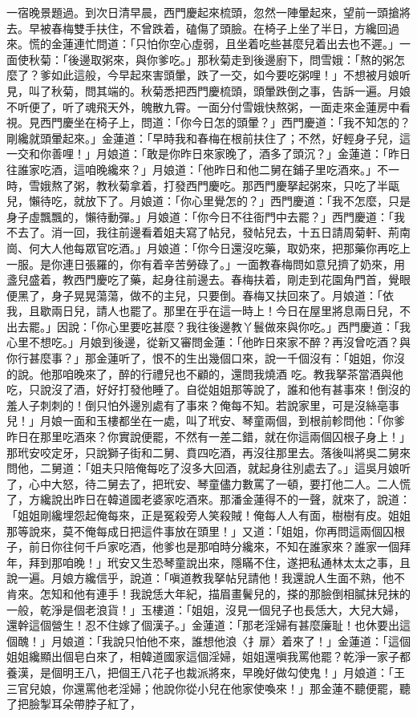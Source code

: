 一宿晚景題過。到次日清早晨，西門慶起來梳頭，忽然一陣暈起來，望前一頭搶將去。早被春梅雙手扶住，不曾跌着，磕傷了頭臉。在椅子上坐了半日，方纔回過來。慌的金蓮連忙問道：「只怕你空心虛弱，且坐着吃些甚麼兒着出去也不遲。」一面使秋菊：「後邊取粥來，與你爹吃。」那秋菊走到後邊廚下，問雪娥：「熬的粥怎麼了？爹如此這般，今早起來害頭暈，跌了一交，如今要吃粥哩！」不想被月娘听見，叫了秋菊，問其端的。秋菊悉把西門慶梳頭，頭暈跌倒之事，告訴一遍。月娘不听便了，听了魂飛天外，魄散九霄。一面分付雪娥快熬粥，一面走來金蓮房中看視。見西門慶坐在椅子上，問道：「你今日怎的頭暈？」西門慶道：「我不知怎的？剛纔就頭暈起來。」金蓮道：「早時我和春梅在根前扶住了；不然，好輕身子兒，這一交和你善哩！」月娘道：「敢是你昨日來家晚了，酒多了頭沉？」金蓮道：「昨日往誰家吃酒，這咱晚纔來？」月娘道：「他昨日和他二舅在鋪子里吃酒來。」不一時，雪娥熬了粥，教秋菊拿着，打發西門慶吃。那西門慶拏起粥來，只吃了半甌兒，懶待吃，就放下了。月娘道：「你心里覺怎的？」西門慶道：「我不怎麼，只是身子虛飄飄的，懶待動彈。」月娘道：「你今日不往衙門中去罷？」西門慶道：「我不去了。消一回，我往前邊看着姐夫寫了帖兒，發帖兒去，十五日請周菊軒、荊南崗、何大人他每眾官吃酒。」月娘道：「你今日還沒吃藥，取奶來，把那藥你再吃上一服。是你連日張羅的，你有着辛苦勞碌了。」一面教春梅問如意兒擠了奶來，用盞兒盛着，教西門慶吃了藥，起身往前邊去。春梅扶着，剛走到花園角門首，覺眼便黑了，身子晃晃蕩蕩，做不的主兒，只要倒。春梅又扶回來了。月娘道：「依我，且歇兩日兒，請人也罷了。那里在乎在這一時上！今日在屋里將息兩日兒，不出去罷。」因說：「你心里要吃甚麼？我往後邊教丫鬟做來與你吃。」西門慶道：「我心里不想吃。」月娘到後邊，從新又審問金蓮：「他昨日來家不醉？再沒曾吃酒？與你行甚麼事？」那金蓮听了，恨不的生出幾個口來，說一千個沒有：「姐姐，你沒的說。他那咱晚來了，醉的行禮兒也不顧的，還問我燒酒 吃。教我拏茶當酒與他吃，只說沒了酒，好好打發他睡了。自從姐姐那等說了，誰和他有甚事來！倒沒的羞人子刺刺的！倒只怕外邊別處有了事來？俺每不知。若說家里，可是沒絲亳事兒！」月娘一面和玉樓都坐在一處，叫了玳安、琴童兩個，到根前軫問他：「你爹昨日在那里吃酒來？你實說便罷，不然有一差二錯，就在你這兩個囚根子身上！」那玳安咬定牙，只說獅子街和二舅、賁四吃酒，再沒往那里去。落後叫將吳二舅來問他，二舅道：「姐夫只陪俺每吃了沒多大回酒，就起身往別處去了。」這吳月娘听了，心中大怒，待二舅去了，把玳安、琴童儘力數罵了一頓，要打他二人。二人慌了，方纔說出昨日在韓道國老婆家吃酒來。那潘金蓮得不的一聲，就來了，說道：「姐姐剛纔埋怨起俺每來，正是冤殺旁人笑殺賊！俺每人人有面，樹樹有皮。姐姐那等說來，莫不俺每成日把這件事放在頭里！」又道：「姐姐，你再問這兩個囚根子，前日你往何千戶家吃酒，他爹也是那咱時分纔來，不知在誰家來？誰家一個拜年，拜到那咱晚！」玳安又生恐琴童說出來，隱瞞不住，遂把私通林太太之事，且說一遍。月娘方纔信乎，說道：「嗔道教我拏帖兒請他！我還說人生面不熟，他不肯來。怎知和他有連手！我說恁大年紀，描眉畫鬢兒的，搽的那臉倒相膩抹兒抹的一般，乾淨是個老浪貨！」玉樓道：「姐姐，沒見一個兒子也長恁大，大兒大婦，還幹這個營生！忍不住嫁了個漢子。」金蓮道：「那老淫婦有甚麼廉耻！也休要出這個醜！」月娘道：「我說只怕他不來，誰想他浪〈扌扉〉着來了！」金蓮道：「這個姐姐纔顯出個皂白來了，相韓道國家這個淫婦，姐姐還嗔我罵他罷？乾淨一家子都養漢，是個明王八，把個王八花子也裁派將來，早晚好做勾使鬼！」月娘道：「王三官兒娘，你還罵他老淫婦；他說你從小兒在他家使喚來！」那金蓮不聽便罷，聽了把臉掣耳朵帶脖子紅了，